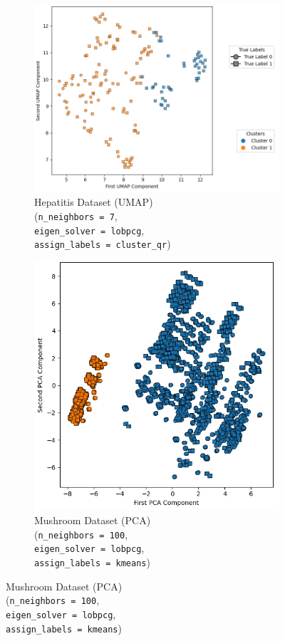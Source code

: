 \begin{figure}[H]
	\centering
	\begin{subfigure}{0.32\textwidth}
		\centering
		\includegraphics[width=0.7\linewidth]{figures/Spectral/hepatitis/best_run_NMI_umap.png}
		\caption{Hepatitis Dataset (UMAP) \\ (\texttt{n\_neighbors = 7}, \\  \texttt{eigen\_solver = lobpcg}, \\ \texttt{assign\_labels = cluster\_qr})}
	\end{subfigure}
	\hfill
	\begin{subfigure}{0.32\textwidth}
		\centering
		\includegraphics[width=0.7\linewidth]{figures/Spectral/mushroom/best_run_NMI_pca.png}
		\caption{Mushroom Dataset (PCA) \\ (\texttt{n\_neighbors = 100}, \\  \texttt{eigen\_solver = lobpcg}, \\ \texttt{assign\_labels = kmeans})}
	\end{subfigure}

\end{figure}
